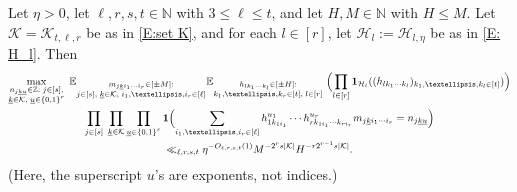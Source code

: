 \documentclass[10pt,a4paper]{amsart}
\newcommand{\Bigbrac}[1]{\Bigl( #1 \Bigr)}
\newcommand{\CH}{{\mathcal H}}
\newcommand{\CK}{{\mathcal K}}
\newcommand{\E}{{\mathbb E}}
\newcommand{\N}{{\mathbb N}}
\newcommand{\Z}{{\mathbb Z}}
\newcommand{\uk}{{\underline{k}}}
\newcommand{\uu}{{\underline{u}}}
\begin{document}
\begin{proposition}\label{P: systems of multilinear equations}
    Let $\eta>0$, let $\ell, r, s, t\in\N$ with $3\leq\ell\leq t$, and let $H, M\in\N$ with $H\leq M$. Let $\CK = \CK_{t, \ell, r}$ be as in \eqref{E:set K}, and for each $l\in[r]$, let $\CH_l:=\CH_{l,\eta}$ be as in \eqref{E: H_l}. Then 
        \begin{multline*}
        \max_{\substack{n_{j\uk\uu}\in\Z:\; j\in[s],\\ \uk\in\CK,\; \uu\in\{0,1\}^r}}\;\E_{\substack{m_{j\uk i_1\cdots i_r}\in[\pm M]:\\ j\in[s],\; \uk\in\CK,\; i_1, \ldots,  i_r\in[\ell]}}
                \E_{\substack{h_{lk_{1}\cdots k_{l}}\in[\pm H]:\\  k_1, \ldots, k_r\in[t],\; l\in[r]}}\; \Bigbrac{\prod_{l\in[r]}\mathbf{1}_{\CH_l}((h_{lk_{1}\cdots k_{l}})_{k_1, \ldots, k_l \in [t]})}\\
        \prod_{j\in[s]}\; \prod_{\substack{\uk\in\CK}}\prod_{\substack{\uu\in\{0,1\}^r
        }} \mathbf{1}\Bigbrac{\sum\limits_{i_1, \ldots, i_r\in[\ell]} h_{1k_{1i_1}}^{u_1} \cdots h_{rk_{1i_1}\cdots k_{ri_r}}^{u_r}m_{j\uk i_1\cdots i_r} = n_{j\uk\uu}}\\
        \ll_{\ell, r, s, t} \eta^{-O_{\ell, r, s,t}(1)}  M^{-2^{r}s|\CK|}H^{-r2^{r-1}s|\CK|}.
    \end{multline*}
(Here, the superscript $u$'s are exponents, not indices.)

\end{proposition}
\end{document}
